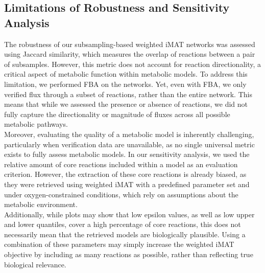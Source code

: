 \subsection{Limitations of Robustness and Sensitivity Analysis}
The robustness of our subsampling-based weighted iMAT networks was assessed using Jaccard similarity, which measures the overlap of reactions between a pair of subsamples. However, this metric does not account for reaction directionality, a critical aspect of metabolic function within metabolic models. To address this limitation, we performed FBA on the networks. Yet, even with FBA, we only verified flux through a subset of reactions, rather than the entire network. This means that while we assessed the presence or absence of reactions, we did not fully capture the directionality or magnitude of fluxes across all possible metabolic pathways. 
\\

Moreover, evaluating the quality of a metabolic model is inherently challenging, particularly when verification data are unavailable, as no single universal metric exists to fully assess metabolic models. In our sensitivity analysis, we used the relative amount of core reactions included within a model as an evaluation criterion. However, the extraction of these core reactions is already biased, as they were retrieved using weighted iMAT with a predefined parameter set and under oxygen-constrained conditions, which rely on assumptions about the metabolic environment. 
\\

Additionally, while plots may show that low epsilon values, as well as low upper and lower quantiles, cover a high percentage of core reactions, this does not necessarily mean that the retrieved models are biologically plausible. Using a combination of these parameters may simply increase the weighted iMAT objective by including as many reactions as possible, rather than reflecting true biological relevance. 

